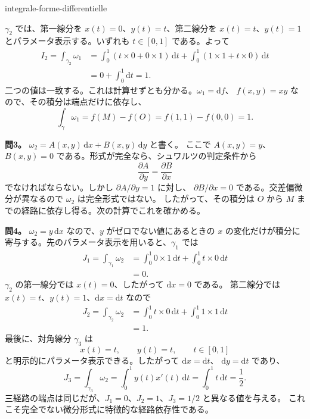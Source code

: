 \begin{exo}[経路に沿った微分形式の積分]{integrale-forme-differentielle}
\begin{solution}
$\gamma_2$ では、第一線分を $x(t)=0$、$y(t)=t$、第二線分を
$x(t)=t$、$y(t)=1$ とパラメータ表示する。いずれも $t\in[0,1]$ である。よって
\[
\begin{aligned}
I_2
= \int_{\gamma_2}\omega_1
&= \int_0^1\left(t\times 0+0\times 1\right)\,\mathrm{d}t
 + \int_0^1\left(1\times 1+t\times 0\right)\,\mathrm{d}t \\
&= 0+\int_0^1\mathrm{d}t = 1.
\end{aligned}
\]
二つの値は一致する。これは計算せずとも分かる。$\omega_1=\mathrm{d}f$、
$f(x,y)=xy$ なので、その積分は端点だけに依存し、
\[
\int_\gamma\omega_1=f(M)-f(O)=f(1,1)-f(0,0)=1.
\]

\textbf{問3。} $\omega_2=A(x,y)\,\mathrm{d}x+B(x,y)\,\mathrm{d}y$ と書く。
ここで $A(x,y)=y$、$B(x,y)=0$ である。形式が完全なら、シュワルツの判定条件から
\[
\frac{\partial A}{\partial y}=\frac{\partial B}{\partial x}
\]
でなければならない。しかし $\partial A/\partial y=1$ に対し、
$\partial B/\partial x=0$ である。交差偏微分が異なるので $\omega_2$ は完全形式ではない。
したがって、その積分は $O$ から $M$ までの経路に依存し得る。次の計算でこれを確かめる。

\textbf{問4。} $\omega_2=y\,\mathrm{d}x$ なので、$y$ がゼロでない値にあるときの
$x$ の変化だけが積分に寄与する。先のパラメータ表示を用いると、$\gamma_1$ では
\[
\begin{aligned}
J_1
=\int_{\gamma_1}\omega_2
&=\int_0^1 0\times 1\,\mathrm{d}t
  +\int_0^1 t\times 0\,\mathrm{d}t \\
&=0.
\end{aligned}
\]
$\gamma_2$ の第一線分では $x(t)=0$、したがって $\mathrm{d}x=0$ である。
第二線分では $x(t)=t$、$y(t)=1$、$\mathrm{d}x=\mathrm{d}t$ なので
\[
\begin{aligned}
J_2
=\int_{\gamma_2}\omega_2
&=\int_0^1 t\times 0\,\mathrm{d}t
  +\int_0^1 1\times 1\,\mathrm{d}t \\
&=1.
\end{aligned}
\]
最後に、対角線分 $\gamma_3$ は
\[
x(t)=t,\qquad y(t)=t,\qquad t\in[0,1]
\]
と明示的にパラメータ表示できる。したがって $\mathrm{d}x=\mathrm{d}t$、
$\mathrm{d}y=\mathrm{d}t$ であり、
\[
J_3
=\int_{\gamma_3}\omega_2
=\int_0^1 y(t)x'(t)\,\mathrm{d}t
=\int_0^1 t\,\mathrm{d}t
=\frac12.
\]
三経路の端点は同じだが、$J_1=0$、$J_2=1$、$J_3=1/2$ と異なる値を与える。
これこそ完全でない微分形式に特徴的な経路依存性である。
\end{solution}
\end{exo}

